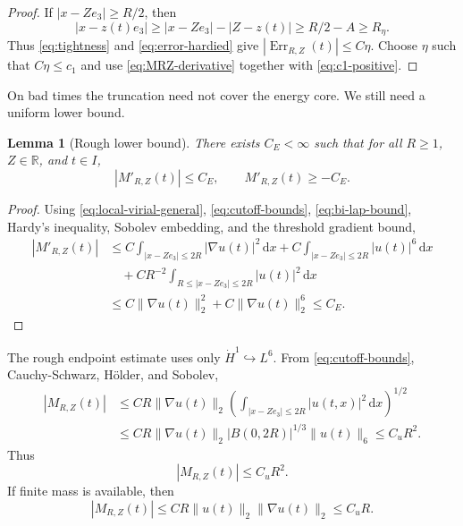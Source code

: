\documentclass[preprint,12pt]{elsarticle}
\numberwithin{equation}{section}
\newcommand{\R}{\mathbb R}
\newcommand{\dd}{\,\mathrm d}
\newcommand{\na}{\nabla}
\newcommand{\ez}{e_3}
\newcommand{\Err}{\operatorname{Err}}
\newtheorem{lemma}[theorem]{Lemma}
\theoremstyle{remark}
\begin{document}
\begin{proof}
If $|x-Z\ez|\ge R/2$, then
\[
  |x-z(t)\ez|\ge |x-Z\ez|-|Z-z(t)|\ge R/2-A\ge R_\eta.
\]
Thus \eqref{eq:tightness} and \eqref{eq:error-hardied} give $|\Err_{R,Z}(t)|\le C\eta$.  Choose $\eta$ such that $C\eta\le c_1$ and use \eqref{eq:MRZ-derivative} together with \eqref{eq:c1-positive}.
\end{proof}

On bad times the truncation need not cover the energy core.  We still need a uniform lower bound.

\begin{lemma}[Rough lower bound]\label{lem:rough-lower}
There exists $C_E<\infty$ such that for all $R\ge1$, $Z\in\R$, and $t\in I$,
\begin{equation}\label{eq:rough-derivative-bound}
  |M'_{R,Z}(t)|\le C_E,
  \qquad M'_{R,Z}(t)\ge -C_E.
\end{equation}
\end{lemma}

\begin{proof}
Using \eqref{eq:local-virial-general}, \eqref{eq:cutoff-bounds}, \eqref{eq:bi-lap-bound}, Hardy's inequality, Sobolev embedding, and the threshold gradient bound,
\begin{align*}
  |M'_{R,Z}(t)|
  &\le C\int_{|x-Z\ez|\le2R}|\na u(t)|^2\dd x
     +C\int_{|x-Z\ez|\le2R}|u(t)|^6\dd x \\
  &\quad +CR^{-2}\int_{R\le |x-Z\ez|\le2R}|u(t)|^2\dd x \\
  &\le C\|\na u(t)\|_2^2+C\|\na u(t)\|_2^6
  \le C_E.
\end{align*}
\end{proof}

The rough endpoint estimate uses only $\dot H^1\hookrightarrow L^6$.  From \eqref{eq:cutoff-bounds}, Cauchy-Schwarz, H\"older, and Sobolev,
\begin{align*}
  |M_{R,Z}(t)|
  &\le C R\|\na u(t)\|_2
  \left(\int_{|x-Z\ez|\le2R}|u(t,x)|^2\dd x\right)^{1/2} \\
  &\le C R\|\na u(t)\|_2 |B(0,2R)|^{1/3}\|u(t)\|_6
  \le C_uR^2.
\end{align*}
Thus
\begin{equation}\label{eq:coarse-endpoint}
  |M_{R,Z}(t)|\le C_uR^2.
\end{equation}
If finite mass is available, then
\begin{equation}\label{eq:mass-endpoint}
  |M_{R,Z}(t)|\le C R\|u(t)\|_2\|\na u(t)\|_2\le C_uR.
\end{equation}
\end{document}
